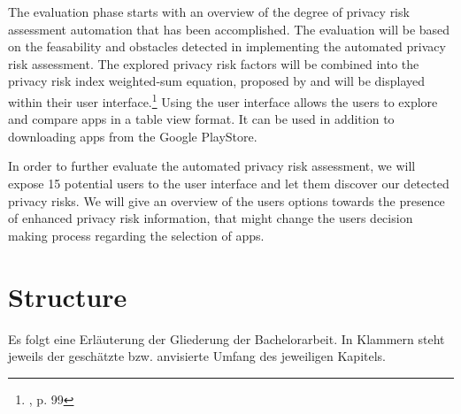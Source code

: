 \documentclass[
	a4paper,
	oneside,
	12pt,
	liststotocnumbered
]{article}
\let\cite\textcite
\begin{document}
The evaluation phase starts with an overview of the degree of privacy risk assessment automation that has been accomplished. 
The evaluation will be based on the feasability and obstacles detected in implementing the automated privacy risk assessment.
The explored privacy risk factors will be combined into the privacy risk index weighted-sum equation, proposed by \cite{Bruggemann2016} and will be displayed within their user interface.\footnote{\cite{Bruggemann2016}, p. 99}
Using the \cite{Bruggemann2016} user interface allows the users to explore and compare \mH apps in a table view format. 
It can be used in addition to downloading apps from the Google PlayStore.

In order to further evaluate the automated privacy risk assessment, we will expose 15 potential users to the user interface and let them discover our detected privacy risks.
We will give an overview of the users options towards the presence of enhanced privacy risk information, that might change the users decision making process regarding the selection of \mH apps.

\section{Structure}

Es folgt eine Erläuterung der Gliederung der Bachelorarbeit. In Klammern steht jeweils der geschätzte bzw. anvisierte Umfang des jeweiligen Kapitels.
\newline\newline
\end{document}
